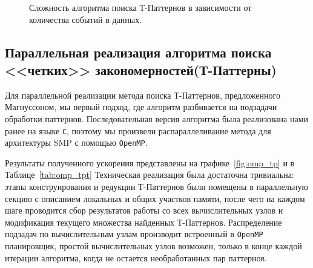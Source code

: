 \documentclass[12pt,fсeqn]{article}
\begin{document}
\begin{figure}[H]
\noindent{}
\caption{ Сложность алгоритма поиска Т-Паттернов в зависимости от количества событий в данных.  }
\label{fig:excomp}
\end{figure}

\subsection[Параллельная реализация алгоритма поиска T-Паттернов]{Параллельная реализация алгоритма поиска <<четких>> закономерностей(Т-Паттерны)}
Для параллельной реализации метода поиска Т-Паттернов, предложенного Магнуссоном, мы
первый подход, где алгоритм разбивается на подзадачи обработки паттернов. Последовательная
версия алгоритма была реализована нами ранее на языке \verb!C!, поэтому мы произвели 
распараллеливание метода для архитектуры SMP с помощью \verb!OpenMP!. 

Результаты полученного ускорения представлены на графике~\ref{fig:omp_tp} и в Таблице~\ref{tab:omp_tpt} Техническая 
реализация была достаточна тривиальна: этапы конструирования и редукции Т-Паттернов были 
помещены в параллельную секцию с описанием локальных и общих участков памяти, после чего на каждом
шаге проводится сбор результатов работы со всех вычислительных узлов и модификация текущего множества найденных Т-Паттернов.
Распределение подзадач по вычислительным узлам производит встроенный в \verb!OpenMP! планировщик, простой
вычислительных узлов возможен, только в конце каждой итерации алгоритма, когда не остается необработанных пар паттернов.
\end{document}
